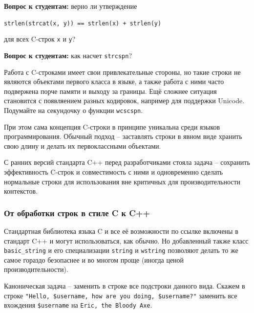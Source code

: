 \documentclass[a4paper,12pt,oneside]{article}
\newif\ifanswers
\begin{document}
\textbf{Вопрос к студентам:} верно ли утверждение 

\lstinline!strlen(strcat(x, y)) == strlen(x) + strlen(y)! 

для всех C-строк \lstinline!x! и \lstinline!y!?

\ifanswers
Правильный ответ: да, потому что \lstinline!strlen! не учитывает завершающий нуль
\fi

\textbf{Вопрос к студентам:} как насчет \lstinline!strcspn!?

\ifanswers
Правильный ответ: вычисляет длину максимального начального сегмента первого аргумента не содержащего ни одного символа из второго аргумента. Знать это вовсе не обязательно. За пример полезного использования этой функции автор был бы признателен.
\fi

Работа с C-строками имеет свои привлекательные стороны, но такие строки не являются объектами первого класса в языке, а также работа с ними часто подвержена порче памяти и выходу за границы. Ещё сложнее ситуация становится с появляением разных кодировок, например для поддержки Unicode. Подумайте на секундочку о функции \lstinline!wcscspn!.

При этом сама концепция C-строки в принципе уникальна среди языков программирования. Обычный подход -- заставлять строки в явном виде хранить свою длину и делать их первоклассными объектами.

С ранних версий стандарта C++ перед разработчиками стояла задача -- сохранить эффективность C-строк и совместимость с ними и одновременно сделать нормальные строки для использования вне критичных для производительности контекстов.

\subsubsection{От обработки строк в стиле C к C++}\label{CStringToStdString}

Стандартная библиотека языка C и все её возможности по ссылке включены в стандарт C++ и могут использоваться, как обычно. Но добавленный также класс \lstinline!basic_string! и его специализации \lstinline!string! и \lstinline!wstring! позволяют делать то же самое гораздо безопаснее и во многом проще (иногда ценой производительности).

Каноническая задача -- заменить в строке все подстроки данного вида. Скажем в строке \lstinline!"Hello, $username, how are you doing, $username?"! заменить все вхождения \lstinline!$username! на \lstinline!Eric, the Bloody Axe!.
\end{document}
